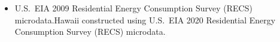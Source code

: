 \begin{itemize}
\item U.S.~EIA 2009 Residential Energy Consumption Survey (RECS) microdata.Hawaii constructed using U.S.~EIA 2020 Residential Energy Consumption Survey (RECS) microdata.
\end{itemize}
